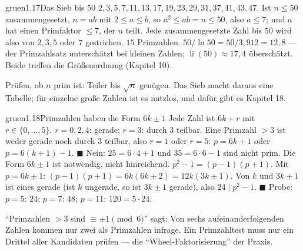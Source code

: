 \begin{loesungkarte}{gruen}{1.17}{Das Sieb bis 50}
$2, 3, 5, 7, 11, 13, 17, 19, 23, 29, 31, 37, 41, 43, 47$.
Ist $n\le50$ zusammengesetzt, $n = ab$ mit $2\le a\le b$, so $a^{2}\le ab = n\le50$, also $a\le7$; und $a$ hat einen Primfaktor $\le7$, der $n$ teilt. Jede zusammengesetzte Zahl bis $50$ wird also von $2, 3, 5$ oder $7$ gestrichen.
$15$ Primzahlen. $50/\ln50 = 50/3{,}912 = 12{,}8$ --- der Primzahlsatz unterschätzt bei kleinen Zahlen; $\operatorname{li}(50)\approx17{,}4$ überschätzt. Beide treffen die Größenordnung (Kapitel 10).
\begin{mitnehmen}\kastentext
Prüfen, ob $n$ prim ist: Teiler bis $\sqrt n$ genügen. Das Sieb macht daraus eine Tabelle; für einzelne große Zahlen ist es nutzlos, und dafür gibt es Kapitel 18.
\end{mitnehmen}
\end{loesungkarte}

\begin{loesungkarte}{gruen}{1.18}{Primzahlen haben die Form $6k\pm1$}
Jede Zahl ist $6k + r$ mit $r\in\{0, \dots, 5\}$. $r = 0, 2, 4$: gerade; $r = 3$: durch $3$ teilbar. Eine Primzahl $> 3$ ist weder gerade noch durch $3$ teilbar, also $r = 1$ oder $r = 5$: $p = 6k + 1$ oder $p = 6(k + 1) - 1$. $\blacksquare$
Nein: $25 = 6\cdot4 + 1$ und $35 = 6\cdot6 - 1$ sind nicht prim. Die Form $6k\pm1$ ist notwendig, nicht hinreichend.
$p^{2} - 1 = (p - 1)(p + 1)$. Mit $p = 6k\pm1$: $(p - 1)(p + 1) = 6k(6k\pm2) = 12k(3k\pm1)$. Von $k$ und $3k\pm1$ ist eines gerade (ist $k$ ungerade, so ist $3k\pm1$ gerade), also $24\mid p^{2} - 1$. $\blacksquare$ Probe: $p = 5$: $24$; $p = 7$: $48$; $p = 11$: $120 = 5\cdot24$. \checkmark
\begin{mitnehmen}\kastentext
\enquote{Primzahlen $> 3$ sind $\equiv\pm1\pmod6$} sagt: Von sechs aufeinanderfolgenden Zahlen kommen nur zwei als Primzahlen infrage. Ein Primzahltest muss nur ein Drittel aller Kandidaten prüfen --- die \enquote{Wheel-Faktorisierung} der Praxis.
\end{mitnehmen}
\end{loesungkarte}

